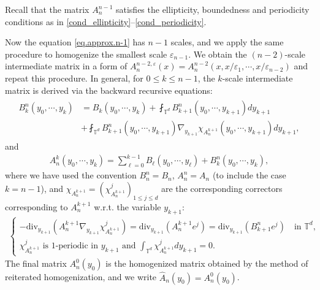 \documentclass[reqno,12pt]{amsart} %
\theoremstyle{definition}
\theoremstyle{remark}
\numberwithin{equation}{section}
\newcommand{\e}{\varepsilon}
\begin{document}
Recall that the matrix $A_n^{n-1}$ satisfies the ellipticity, boundedness and periodicity conditions as in \eqref{cond_ellipticity}--\eqref{cond_periodicity}. 


Now the equation \eqref{eq.approx.n-1} has $n-1$ scales, and we apply the same procedure to homogenize the smallest scale $\e_{n-1}$. We obtain the $(n-2)$-scale intermediate matrix in a form of $A_n^{n-2, \e}(x) = A_n^{n-2}(x,x/\e_1,\cdots,x/\e_{n-2})$ and repeat this procedure. In general, for $0\le k \le n-1$, the $k$-scale intermediate matrix is derived via the backward recursive equations:
\begin{align}\label{iden_Blk}
\begin{split}
B_{k}^n(y_0, \cdots, y_{k})&=B_{k}(y_0, \cdots, y_{k})+\fint_{\mathbb{T}^d}B_{k+1}^n(y_0, \cdots, y_{k+1})dy_{k+1}\\&+\fint_{\mathbb{T}^d}B_{k+1}^n(y_0, \cdots, y_{k+1})\nabla_{y_{k+1}} \chi_{A_n^{k+1}}(y_0, \cdots, y_{k+1})dy_{k+1},
\end{split}
\end{align}
and
\begin{align}\label{expression_Ank}
  A_n^{k}(y_0, \cdots, y_{k})=\sum_{\ell=0}^{k-1} B_\ell(y_0, \cdots, y_\ell)+B_{k}^{n}(y_0, \cdots, y_{k}), 
\end{align}
where we have used the convention $B^n_n=B_n$, $A_n^n=A_n$ (to include the case $k = n-1$), and $\chi_{A_n^{k+1}} = (\chi_{A_n^{k+1}}^j)_{1\le j\le d}$ are the corresponding correctors corresponding to $A_n^{k+1}$ w.r.t. the variable $y_{k+1}$:
\begin{align}\label{eq.chi.k+1}
  \begin{cases}
    -\mathrm{div}_{y_{k+1}}(A_n^{k+1}\nabla_{y_{k+1}} \chi_{A_n^{k+1}}^j) = \mathrm{div}_{y_{k+1}}(A_n^{k+1} e^j)=\mathrm{div}_{y_{k+1}}(B^n_{k+1} e^j)\quad \text{in }\mathbb{T}^d,\\
  \chi_{A_n^{k+1}}^j \text{ is $1$-periodic in }y_{k+1} \text{ and }\int_{\mathbb{T}^d}\chi_{A_n^{k+1}}^j dy_{k+1} = 0.
  \end{cases}
\end{align}
The final matrix $A^0_n(y_0)$ is the homogenized matrix obtained by the method of reiterated homogenization, and we write $\widehat{A}_n(y_0)=A_n^0(y_0)$.
\end{document}
